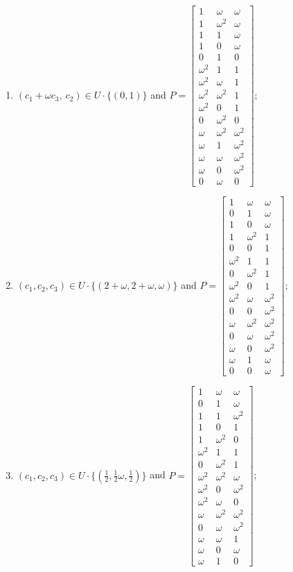 \begin{enumerate}
\item[(f86)] $(c_1+\omega c_3,\ c_2)\in U\cdot\{(0,1)\}$ and $P=\begin{bmatrix}1&\omega&\omega\\1&\omega^2&\omega\\1&1&\omega\\1&0&\omega\\0&1&0\\\omega^2&1&1\\\omega^2&\omega&1\\\omega^2&\omega^2&1\\\omega^2&0&1\\0&\omega^2&0\\\omega&\omega^2&\omega^2\\\omega&1&\omega^2\\\omega&\omega&\omega^2\\\omega&0&\omega^2\\0&\omega&0\end{bmatrix}$;
\item[(f87)\,\newitem] $(c_1,c_2,c_3)\in U\cdot\{(2+\omega,2+\omega,\omega)\}$ and $P=\begin{bmatrix}1&\omega&\omega\\0&1&\omega\\1&0&\omega\\1&\omega^2&1\\0&0&1\\\omega^2&1&1\\0&\omega^2&1\\\omega^2&0&1\\\omega^2&\omega&\omega^2\\0&0&\omega^2\\\omega&\omega^2&\omega^2\\0&\omega&\omega^2\\\omega&0&\omega^2\\\omega&1&\omega\\0&0&\omega\end{bmatrix}$;
\item[(f88)\,\newitem] $(c_1,c_2,c_3)\in U\cdot\{(\tfrac{1}{2},\tfrac{1}{2}\omega,\tfrac{1}{2})\}$ and $P=\begin{bmatrix}1&\omega&\omega\\0&1&\omega\\1&1&\omega^2\\1&0&1\\1&\omega^2&0\\\omega^2&1&1\\0&\omega^2&1\\\omega^2&\omega^2&\omega\\\omega^2&0&\omega^2\\\omega^2&\omega&0\\\omega&\omega^2&\omega^2\\0&\omega&\omega^2\\\omega&\omega&1\\\omega&0&\omega\\\omega&1&0\end{bmatrix}$;

\end{enumerate}
